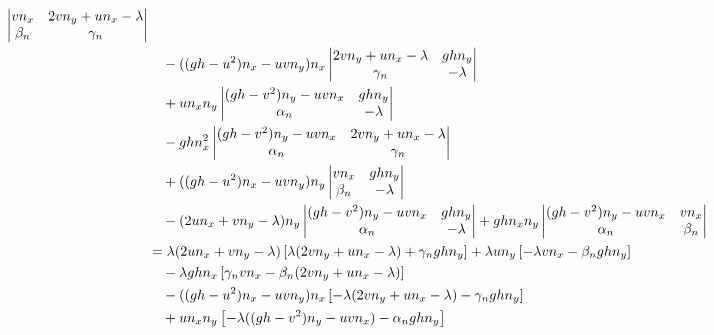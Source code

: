 \documentclass[11pt, a4paper, oneside]{report}
\begin{document}
\begin{appendices}
\begin{align}
\begin{vmatrix}
        v n_x & 2v n_y + u n_x - \lambda \\
        \beta_n & \gamma_n
    \end{vmatrix} \notag \\
    & \quad -((gh - u^2) n_x - uv n_y) n_x \begin{vmatrix}
        2v n_y + u n_x - \lambda & gh n_y \\
        \gamma_n & -\lambda
    \end{vmatrix} \notag \\
    & \quad + u n_x n_y \begin{vmatrix}
        (gh - v^2) n_y - uv n_x & gh n_y \\
        \alpha_n & -\lambda
    \end{vmatrix} \notag \\
    & \quad - gh n_x^2 \begin{vmatrix}
        (gh - v^2) n_y - uv n_x & 2v n_y + u n_x -\lambda \\
        \alpha_n & \gamma_n
    \end{vmatrix} \notag \\
    & \quad + ((gh - u^2) n_x - uv n_y) n_y \begin{vmatrix}
        v n_x & gh n_y \\
        \beta_n & - \lambda
    \end{vmatrix} \notag \\
    & \quad - (2u n_x + v n_y - \lambda) n_y \begin{vmatrix}
        (gh - v^2) n_y - uv n_x & gh n_y \\
        \alpha_n & -\lambda
    \end{vmatrix} + gh n_x n_y \begin{vmatrix}
        (gh - v^2) n_y - uv n_x & v n_x \\
        \alpha_n & \beta_n
    \end{vmatrix} \notag \\
    & = \lambda (2u n_x + v n_y - \lambda) \left[ \lambda (2v n_y + u n_x - \lambda) + \gamma_n gh n_y \right] + \lambda u n_y \left[ - \lambda v n_x - \beta_n gh n_y \right] \notag \\
    & \quad - \lambda gh n_x \left[ \gamma_n v n_x - \beta_n (2v n_y + u n_x - \lambda) \right] \notag \\
    & \quad - ((gh - u^2) n_x - uv n_y) n_x \left[ - \lambda(2v n_y + u n_x - \lambda) - \gamma_n gh n_y \right] \notag \\
    & \quad + u n_x n_y \left[ - \lambda((gh - v^2) n_y - uv n_x) - \alpha_n gh n_y \right] \notag \\

\end{align}
\end{appendices}
\end{document}
